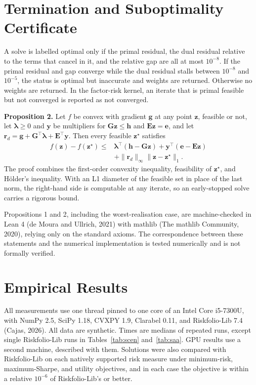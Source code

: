 \documentclass[10pt,twocolumn,letterpaper]{article}
\begin{document}
\section{Termination and Suboptimality Certificate}

A solve is labelled optimal only if the primal residual, the dual residual relative to the terms that cancel in it, and the relative gap are all at most $10^{-8}$. If the primal residual and gap converge while the dual residual stalls between $10^{-8}$ and $10^{-5}$, the status is optimal but inaccurate and weights are returned. Otherwise no weights are returned. In the factor-risk kernel, an iterate that is primal feasible but not converged is reported as not converged.

\textbf{Proposition 2.} Let $f$ be convex with gradient $\mathbf{g}$ at any point $\mathbf{z}$, feasible or not, let $\bm{\lambda} \ge 0$ and $\mathbf{y}$ be multipliers for $\mathbf{G}\mathbf{z} \le \mathbf{h}$ and $\mathbf{E}\mathbf{z} = \mathbf{e}$, and let $\mathbf{r}_d = \mathbf{g} + \mathbf{G}^\top\bm{\lambda} + \mathbf{E}^\top\mathbf{y}$. Then every feasible $\mathbf{z}^\star$ satisfies
\begin{align}
f(\mathbf{z}) - f(\mathbf{z}^\star) \le{}& \bm{\lambda}^\top(\mathbf{h} - \mathbf{G}\mathbf{z}) + \mathbf{y}^\top(\mathbf{e} - \mathbf{E}\mathbf{z}) \nonumber\\
& + \|\mathbf{r}_d\|_\infty \|\mathbf{z} - \mathbf{z}^\star\|_1. \label{eq:cert}
\end{align}
The proof combines the first-order convexity inequality, feasibility of $\mathbf{z}^\star$, and H\"older's inequality. With an L1 diameter of the feasible set in place of the last norm, the right-hand side is computable at any iterate, so an early-stopped solve carries a rigorous bound.

Propositions 1 and 2, including the worst-realisation case, are machine-checked in Lean 4 (de Moura and Ullrich, 2021) with mathlib (The mathlib Community, 2020), relying only on the standard axioms. The correspondence between these statements and the numerical implementation is tested numerically and is not formally verified.

\section{Empirical Results}

All measurements use one thread pinned to one core of an Intel Core i5-7300U, with NumPy 2.5, SciPy 1.18, CVXPY 1.9, Clarabel 0.11, and Riskfolio-Lib 7.4 (Cajas, 2026). All data are synthetic. Times are medians of repeated runs, except single Riskfolio-Lib runs in Tables~\ref{tab:scen} and~\ref{tab:saa}. GPU results use a second machine, described with them. Solutions were also compared with Riskfolio-Lib on each natively supported risk measure under minimum-risk, maximum-Sharpe, and utility objectives, and in each case the objective is within a relative $10^{-6}$ of Riskfolio-Lib's or better.
\end{document}
